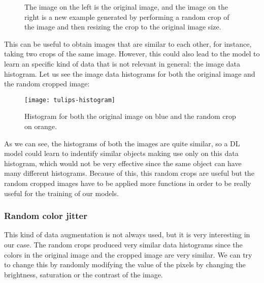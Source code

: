 

\begin{figure}[htp] 
    \centering
    \hfill%
        \caption{The image on the left is the original image, and the image on the right is a new example generated by performing a random crop of the image and then resizing the crop to the original image size.}
\end{figure}

This can be useful to obtain images that are similar to each other, for instance, taking two crops of the same image. However, this could also lead to the model to learn an specific kind of data that is not relevant in general: the image data histogram. Let us see the image data histograms for both the original image and the random cropped image:

\begin{figure}[htp] 
    \centering
    \texttt{[image: tulips-histogram]}%
        \label{fig:hist:orig:cropped}%
        \caption{Histogram for both the original image on blue and the random crop on orange.}
\end{figure}

As we can see, the histograms of both the images are quite similar, so a DL model could learn to indentify similar objects making use only on this data histogram, which would not be very effective since the same object can have many different histograms. Because of this, this random crops are useful but the random cropped images have to be applied more functions in order to be really useful for the training of our models. 


\subsubsection*{Random color jitter}

This kind of data augmentation is not always used, but it is very interesting in our case. The random crops produced very similar data histograms since the colors in the original image and the cropped image are very similar. We can try to change this by randomly modifying the value of the pixels by changing the brightness, saturation or the contrast of the image.

